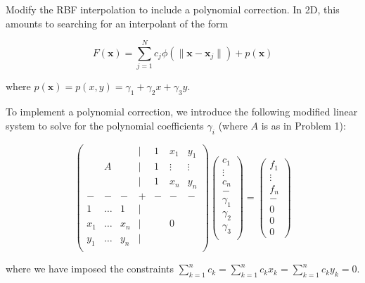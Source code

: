 Modify the RBF interpolation to include a polynomial correction. In 2D, this amounts to searching for an interpolant of
the form

$$
F(\bm{x}) = \sum\limits_{j=1}^N c_j \phi\left( \lVert \bm{x} - \bm{x}_j \rVert \right) + p(\bm{x})
$$

where $p(\bm{x}) = p(x, y) = \gamma_1 + \gamma_2 x + \gamma_3 y$.

\begin{solution}
    To implement a polynomial correction, we introduce the following modified linear system to solve for the polynomial 
    coefficients $\gamma_i$ (where $A$ is as in Problem 1):

    $$
    \begin{pmatrix}
          &       &     & | & 1 & x_1    & y_1    \\
          & A     &     & | & 1 & \vdots & \vdots \\
          &       &     & | & 1 & x_n    & y_n    \\
        - & -     &   - & + & - & -      & -      \\
        1 & \dots &   1 & | &   &        &        \\
      x_1 & \dots & x_n & | &   & 0      &        \\
      y_1 & \dots & y_n & | &   &        &        \\
    \end{pmatrix} \begin{pmatrix}
      c_1 \\
      \vdots \\
      c_n \\
      - \\
      \gamma_1 \\
      \gamma_2 \\
      \gamma_3 \\
    \end{pmatrix} = \begin{pmatrix}
      f_1 \\
      \vdots \\
      f_n \\
      - \\
      0 \\
      0 \\
      0
    \end{pmatrix}
    $$

    where we have imposed the constraints 
    $\sum\limits_{k=1}^n c_k = \sum\limits_{k=1}^n c_k x_k = \sum\limits_{k=1}^n c_k y_k = 0$.


\end{solution}
